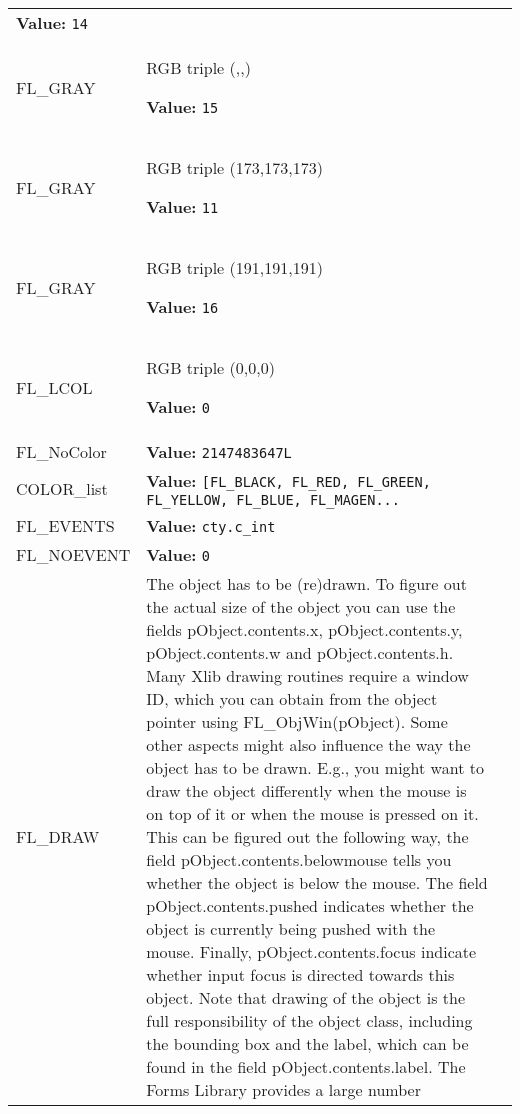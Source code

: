\begin{longtable}{|p{\varnamewidth}|p{\vardescrwidth}|l}
\textbf{Value:} 
{\tt 14}&\\
\cline{1-2}
\raggedright F\-L\-\_\-G\-R\-A\-Y\-9\-0\- & \raggedright RGB triple (,,)

\textbf{Value:} 
{\tt 15}&\\
\cline{1-2}
\raggedright F\-L\-\_\-G\-R\-A\-Y\-6\-3\- & \raggedright RGB triple (173,173,173)

\textbf{Value:} 
{\tt 11}&\\
\cline{1-2}
\raggedright F\-L\-\_\-G\-R\-A\-Y\-7\-5\- & \raggedright RGB triple (191,191,191)

\textbf{Value:} 
{\tt 16}&\\
\cline{1-2}
\raggedright F\-L\-\_\-L\-C\-O\-L\- & \raggedright RGB triple (0,0,0)

\textbf{Value:} 
{\tt 0}&\\
\cline{1-2}
\raggedright F\-L\-\_\-N\-o\-C\-o\-l\-o\-r\- & \raggedright \textbf{Value:} 
{\tt 2147483647L}&\\
\cline{1-2}
\raggedright C\-O\-L\-O\-R\-\_\-l\-i\-s\-t\- & \raggedright \textbf{Value:} 
{\tt [FL\_BLACK, FL\_RED, FL\_GREEN, FL\_YELLOW, FL\_BLUE, FL\_MAGEN\texttt{...}}&\\
\cline{1-2}
\raggedright F\-L\-\_\-E\-V\-E\-N\-T\-S\- & \raggedright \textbf{Value:} 
{\tt cty.c\_int}&\\
\cline{1-2}
\raggedright F\-L\-\_\-N\-O\-E\-V\-E\-N\-T\- & \raggedright \textbf{Value:} 
{\tt 0}&\\
\cline{1-2}
\raggedright F\-L\-\_\-D\-R\-A\-W\- & \raggedright The object has to be (re)drawn. To figure out the actual size of the
object you can use the fields pObject.contents.x, pObject.contents.y,
pObject.contents.w and pObject.contents.h. Many Xlib drawing routines
require a window ID, which you can obtain from the object pointer using
FL\_ObjWin(pObject). Some other aspects might also influence the way
the object has to be drawn. E.g., you might want to draw the object
differently when the mouse is on top of it or when the mouse is
pressed on it. This can be figured out the following way, the field
pObject.contents.belowmouse tells you whether the object is below the
mouse. The field pObject.contents.pushed indicates whether the object is
currently being pushed with the mouse. Finally, pObject.contents.focus
indicate whether input focus is directed towards this object. Note
that drawing of the object is the full responsibility of the object
class, including the bounding box and the label, which can be found in
the field pObject.contents.label. The Forms Library provides a large number

\end{longtable}
